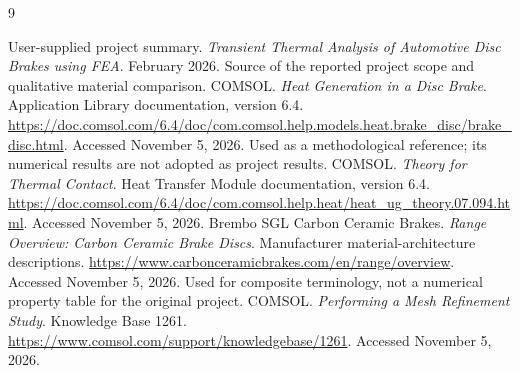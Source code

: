 \documentclass[11pt,a4paper]{article}
\begin{document}
\clearpage\begin{thebibliography}{9}
 User-supplied project summary. \emph{Transient Thermal Analysis of Automotive Disc Brakes using FEA}. February 2026. Source of the reported project scope and qualitative material comparison.
 COMSOL. \emph{Heat Generation in a Disc Brake}. Application Library documentation, version 6.4. \url{https://doc.comsol.com/6.4/doc/com.comsol.help.models.heat.brake_disc/brake_disc.html}. Accessed November 5, 2026. Used as a methodological reference; its numerical results are not adopted as project results.
 COMSOL. \emph{Theory for Thermal Contact}. Heat Transfer Module documentation, version 6.4. \url{https://doc.comsol.com/6.4/doc/com.comsol.help.heat/heat_ug_theory.07.094.html}. Accessed November 5, 2026.
 Brembo SGL Carbon Ceramic Brakes. \emph{Range Overview: Carbon Ceramic Brake Discs}. Manufacturer material-architecture descriptions. \url{https://www.carbonceramicbrakes.com/en/range/overview}. Accessed November 5, 2026. Used for composite terminology, not a numerical property table for the original project.
 COMSOL. \emph{Performing a Mesh Refinement Study}. Knowledge Base 1261. \url{https://www.comsol.com/support/knowledgebase/1261}. Accessed November 5, 2026.
\end{thebibliography}
\end{document}
